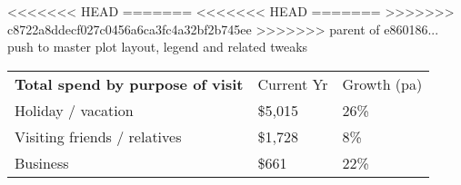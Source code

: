 <<<<<<< HEAD
=======
<<<<<<< HEAD
=======
>>>>>>> c8722a8ddecf027c0456a6ca3fc4a32bf2b745ee
>>>>>>> parent of e860186... push to master plot layout, legend and related tweaks
\begin{tabular}[t]{p{5.1cm}>{\hfill}p{1.1cm}>{\hfill}p{1.3cm}}
 \textbf{Total spend by purpose of visit} & Current Yr & Growth (pa) \\ 
 Holiday / vacation & \$5,015 & 26\% \\ 
  Visiting friends / relatives & \$1,728 & 8\% \\ 
  Business & \$661   & 22\% \\ 
  \end{tabular}
